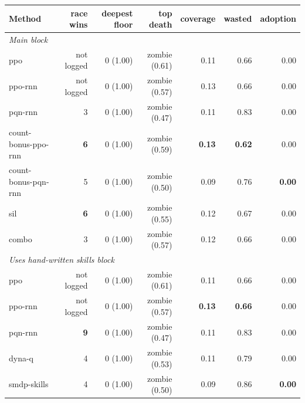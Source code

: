 \begin{tabular}{lrrrrrr}
\toprule
Method & race wins & deepest floor & top death & coverage & wasted & adoption \\
\midrule
\multicolumn{7}{l}{\emph{Main block}} \\
ppo & not logged & 0 (1.00) & zombie (0.61) & 0.11 & 0.66 & 0.00 \\
ppo-rnn & not logged & 0 (1.00) & zombie (0.57) & 0.13 & 0.66 & 0.00 \\
pqn-rnn & 3 & 0 (1.00) & zombie (0.47) & 0.11 & 0.83 & 0.00 \\
count-bonus-ppo-rnn & \textbf{6} & 0 (1.00) & zombie (0.59) & \textbf{0.13} & \textbf{0.62} & 0.00 \\
count-bonus-pqn-rnn & 5 & 0 (1.00) & zombie (0.50) & 0.09 & 0.76 & \textbf{0.00} \\
sil & \textbf{6} & 0 (1.00) & zombie (0.55) & 0.12 & 0.67 & 0.00 \\
combo & 3 & 0 (1.00) & zombie (0.57) & 0.12 & 0.66 & 0.00 \\
\midrule
\multicolumn{7}{l}{\emph{Uses hand-written skills block}} \\
ppo & not logged & 0 (1.00) & zombie (0.61) & 0.11 & 0.66 & 0.00 \\
ppo-rnn & not logged & 0 (1.00) & zombie (0.57) & \textbf{0.13} & \textbf{0.66} & 0.00 \\
pqn-rnn & \textbf{9} & 0 (1.00) & zombie (0.47) & 0.11 & 0.83 & 0.00 \\
dyna-q & 4 & 0 (1.00) & zombie (0.53) & 0.11 & 0.79 & 0.00 \\
smdp-skills & 4 & 0 (1.00) & zombie (0.50) & 0.09 & 0.86 & \textbf{0.00} \\
\bottomrule
\end{tabular}

